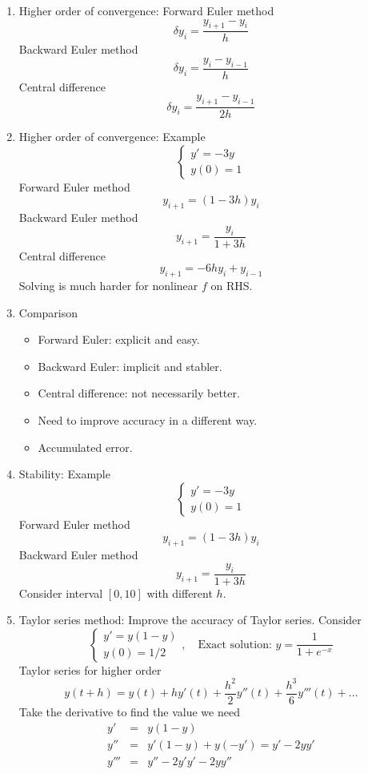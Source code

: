 \documentclass{article}
\theoremstyle{remark}
\begin{document}
\begin{enumerate}
\item Higher order of convergence:
Forward Euler method
$$
\delta y_i  = \frac{y_{i+1}-y_i}{h}
$$
Backward Euler method
$$
\delta y_i  = \frac{y_{i}-y_{i-1}}{h}
$$
Central difference
$$
\delta y_i  = \frac{y_{i+1}-y_{i-1}}{2h}
$$

\item Higher order of convergence: 
Example
$$
\left\{\begin{array}{l}
y' = -3y\\
y(0) =1
\end{array}\right.
$$
Forward Euler method
$$
y_{i+1}  = (1-3h)y_{i}
$$
Backward Euler method
$$
y_{i+1}  = \frac{y_{i}}{1+3h}
$$
Central difference
$$
y_{i+1} = -6hy_i+y_{i-1}
$$
Solving is much harder for nonlinear $f$ on RHS.

\item Comparison
\begin{itemize}
\item Forward Euler: explicit and easy.
\item Backward Euler: implicit and {\color{red} stabler}.
\item Central difference: not necessarily better.
\item Need to improve accuracy in a different way.
\item Accumulated error.
\end{itemize}

\item Stability: Example
$$
\left\{\begin{array}{l}
y' = -3y\\
y(0) =1
\end{array}\right.
$$
Forward Euler method
$$
y_{i+1}  = (1-3h)y_{i}
$$
Backward Euler method
$$
y_{i+1}  = \frac{y_{i}}{1+3h}
$$
Consider interval $[0,10]$ with different $h$.

\item Taylor series method:
Improve the accuracy of Taylor series. Consider
$$
\left\{\begin{array}{l}
y'= y(1-y)\\
y(0) = 1/2
\end{array}\right.,\quad \text{Exact solution: } y = \frac{1}{1+e^{-x}}
$$
Taylor series for higher order
$$
y(t+h) = y(t) + hy'(t)+\frac{h^2}{2}y''(t) + \frac{h^3}{6}y'''(t)+\dots
$$
Take the derivative to find the value we need
\begin{eqnarray*}
y' &=& y(1-y)\\
y'' &= &y'(1-y)+y(-y') = y'-2yy'\\
y''' & = & y''-2y'y'-2yy''
\end{eqnarray*}


\end{enumerate}
\end{document}
